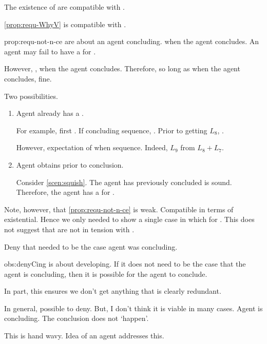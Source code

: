 \begin{note}
  The existence of  are compatible with \issueConstraint{}.

  \begin{observation}%
    \label{prop:requ-not-n-ce}%
    \autoref{prop:requ-WhyV} is compatible with \issueConstraint{}.
  \end{observation}

  \begin{motivation}{prop:requ-not-n-ce}
     are about an agent concluding.
    \fc{} when the agent concludes.
    An agent may fail to have a \wit{} for \fc{}.

    However, \issueConstraint{}, \wit{} when the agent concludes.
    Therefore, so long as \wit{} when the agent concludes, fine.

    Two possibilities.
    \begin{enumerate}
    \item
      Agent already has a \wit{}.

      For example, first .
      If concluding sequence, \fc{}.
      Prior to getting \(L_{8}\), \fc{}.

      However, expectation of \wit{} when sequence.
      Indeed, \(L_{9}\) from \(L_{8} + L_{7}\).
    \item
      Agent obtains \wit{} prior to conclusion.

      Consider \autoref{scen:squish}.
      The agent has previously concluded \sqE{} is sound.
      Therefore, the agent has a \wit{} for \ros{}.
    \end{enumerate}
    \vspace{-\baselineskip}
  \end{motivation}

  Note, however, that \autoref{prop:requ-not-n-ce} is weak.
  Compatible in terms of existential.
  Hence we only needed to show a single case in which \wit{} for \requ{}.
  This does not suggest that  are not in tension with \issueConstraint{}.
\end{note}

\begin{note}
  \begin{observation}
    \label{obs:denyCing}
    Deny that needed to be the case agent was concluding.
  \end{observation}

  \begin{motivation}{obs:denyCing}
    \qWhyV{} is about developing.
    If it does not need to be the case that the agent is concluding, then it is possible for the agent to conclude.
  \end{motivation}

  In part, this ensures we don't get anything that is clearly redundant.

  In general, possible to deny.
  But, I don't think it is viable in many cases.
  Agent is concluding.
  The conclusion does not `happen'.

  This is hand wavy.
  Idea of an agent \tCV{} addresses this.
\end{note}



